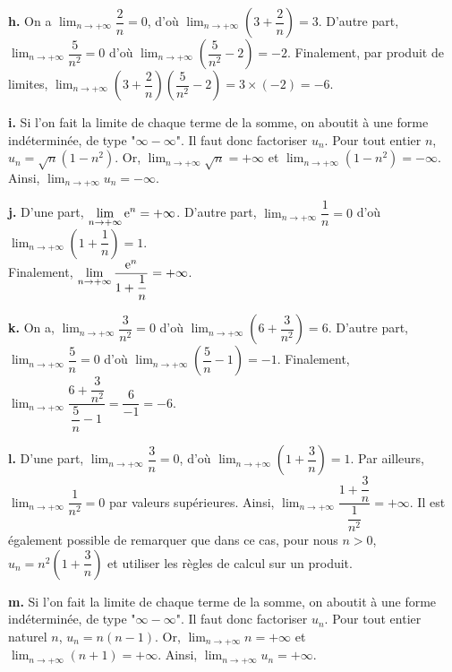 \documentclass[11pt,fleqn]{book} %
\begin{document}
\begin{solution}
\textbf{h.} On a $\displaystyle \lim _{n\to +\infty} \dfrac{2}{n}=0$, d'où $\displaystyle \lim _{n\to +\infty} \left(3+\dfrac{2}{n}\right)=3$. D'autre part, $\displaystyle \lim _{n\to +\infty} \dfrac{5}{n^2}=0$ d'où $\displaystyle \lim _{n\to +\infty} \left(\dfrac{5}{n^2}-2\right)=-2$. Finalement, par produit de limites, $\displaystyle \lim _{n\to +\infty} \left(3+\dfrac{2}{n}\right)\left(\dfrac{5}{n^2}-2\right)=3\times (-2)=-6$.

\textbf{i.} Si l'on fait la limite de chaque terme de la somme, on aboutit à une forme indéterminée, de type "$\infty - \infty $". Il faut donc factoriser $u_n$. Pour tout entier $n$, $u_n=\sqrt{n}(1-n^2)$. Or, $\displaystyle \lim _{n\to +\infty} \sqrt{n}=+\infty$ et $\displaystyle \lim _{n\to +\infty} (1-n^2)=-\infty$. Ainsi, $\displaystyle \lim _{n\to +\infty} u_n = -\infty$.

\textbf{j.} D'une part, $\displaystyle \lim_{n \to +\infty} \mathrm{e}^n = +\infty$. D'autre part, $\displaystyle \lim_{n \to +\infty} \dfrac{1}{n} = 0$ d'où $\displaystyle \lim_{n \to +\infty} \left(1+\dfrac{1}{n}\right)=1$.\\ Finalement, $\displaystyle \lim_{n \to +\infty} \dfrac{\mathrm{e}^n}{1+\dfrac{1}{n}}=+\infty$.

\textbf{k.} On a, $\displaystyle \lim_{n \to +\infty} \dfrac{3}{n^2}=0$ d'où $\displaystyle \lim_{n \to +\infty} \left(6+\dfrac{3}{n^2}\right)=6$. D'autre part, $\displaystyle \lim_{n \to +\infty} \dfrac{5}{n}=0$ d'où $\displaystyle \lim_{n \to +\infty} \left(\dfrac{5}{n}-1\right)=-1$. Finalement, $\displaystyle \lim_{n \to +\infty}\dfrac{6+\dfrac{3}{n^2}}{\dfrac{5}{n}-1}=\dfrac{6}{-1}=-6$.

\textbf{l.} D'une part, $\displaystyle \lim_{n \to +\infty} \dfrac{3}{n}=0$, d'où $\displaystyle \lim_{n \to +\infty} \left(1+\dfrac{3}{n}\right)=1$. Par ailleurs, $\displaystyle \lim_{n \to +\infty} \dfrac{1}{n^2}=0$ par valeurs supérieures. Ainsi, $\displaystyle \lim_{n \to +\infty} \dfrac{1+\dfrac{3}{n}}{\dfrac{1}{n^2}}=+\infty$. Il est également possible de remarquer que dans ce cas, pour nous $n>0$, $u_n=n^2\left(1+\dfrac{3}{n}\right)$ et utiliser les règles de calcul sur un produit.

\textbf{m.} Si l'on fait la limite de chaque terme de la somme, on aboutit à une forme indéterminée, de type "$\infty - \infty $". Il faut donc factoriser $u_n$. Pour tout entier naturel $n$, $u_n=n(n-1)$. Or, $\displaystyle \lim_{n \to +\infty}n=+\infty$ et $\displaystyle \lim_{n \to +\infty}(n+1)=+\infty$. Ainsi, $\displaystyle \lim_{n \to +\infty}u_n=+\infty$.


\end{solution}
\end{document}
